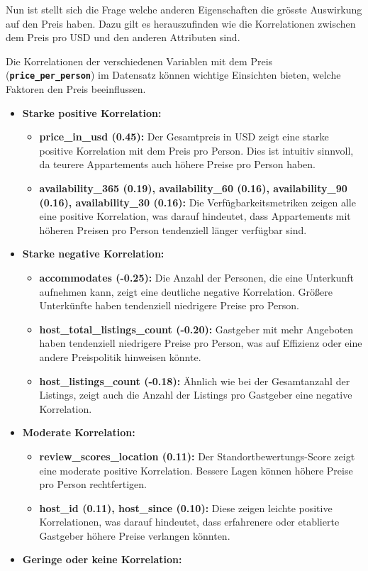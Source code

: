 \documentclass[
  journal,
]{IEEEtran}%
\begin{document}
Nun ist stellt sich die Frage welche anderen Eigenschaften die grösste
Auswirkung auf den Preis haben. Dazu gilt es herauszufinden wie die
Korrelationen zwischen dem Preis pro USD und den anderen Attributen
sind.

Die Korrelationen der verschiedenen Variablen mit dem Preis
(\textbf{\texttt{price\_per\_person}}) im Datensatz können wichtige
Einsichten bieten, welche Faktoren den Preis beeinflussen.

\begin{itemize}
\item
  \textbf{Starke positive Korrelation:}

  \begin{itemize}
  \item
    \textbf{price\_in\_usd (0.45):} Der Gesamtpreis in USD zeigt eine
    starke positive Korrelation mit dem Preis pro Person. Dies ist
    intuitiv sinnvoll, da teurere Appartements auch höhere Preise pro
    Person haben.
  \item
    \textbf{availability\_365 (0.19), availability\_60 (0.16),
    availability\_90 (0.16), availability\_30 (0.16):} Die
    Verfügbarkeitsmetriken zeigen alle eine positive Korrelation, was
    darauf hindeutet, dass Appartements mit höheren Preisen pro Person
    tendenziell länger verfügbar sind.
  \end{itemize}
\item
  \textbf{Starke negative Korrelation:}

  \begin{itemize}
  \item
    \textbf{accommodates (-0.25):} Die Anzahl der Personen, die eine
    Unterkunft aufnehmen kann, zeigt eine deutliche negative
    Korrelation. Größere Unterkünfte haben tendenziell niedrigere Preise
    pro Person.
  \item
    \textbf{host\_total\_listings\_count (-0.20):} Gastgeber mit mehr
    Angeboten haben tendenziell niedrigere Preise pro Person, was auf
    Effizienz oder eine andere Preispolitik hinweisen könnte.
  \item
    \textbf{host\_listings\_count (-0.18):} Ähnlich wie bei der
    Gesamtanzahl der Listings, zeigt auch die Anzahl der Listings pro
    Gastgeber eine negative Korrelation.
  \end{itemize}
\item
  \textbf{Moderate Korrelation:}

  \begin{itemize}
  \item
    \textbf{review\_scores\_location (0.11):} Der
    Standortbewertungs-Score zeigt eine moderate positive Korrelation.
    Bessere Lagen können höhere Preise pro Person rechtfertigen.
  \item
    \textbf{host\_id (0.11), host\_since (0.10):} Diese zeigen leichte
    positive Korrelationen, was darauf hindeutet, dass erfahrenere oder
    etablierte Gastgeber höhere Preise verlangen könnten.
  \end{itemize}
\item
  \textbf{Geringe oder keine Korrelation:}


\end{itemize}
\end{document}
